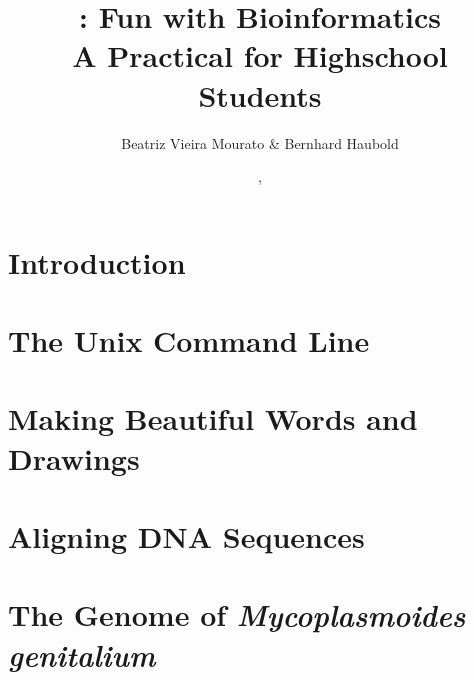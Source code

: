 \documentclass[a4paper]{report}
\begin{document}
\pagestyle{noweb}

\title{:  Fun with Bioinformatics\\\small A Practical for
  Highschool Students\\\scriptsize {}}
\author{Beatriz Vieira Mourato \& Bernhard Haubold}
\date{\hspace{-3pt}, }
\maketitle

\tableofcontents

\chapter{Introduction}\label{ch:intro}

\chapter{The Unix Command Line}\label{ch:unix}

\chapter{Making Beautiful Words and Drawings}\label{ch:latex}

\chapter{Aligning DNA Sequences}\label{ch:al}

\chapter{The Genome of \emph{Mycoplasmoides genitalium}}\label{ch:genome}



\end{document}
